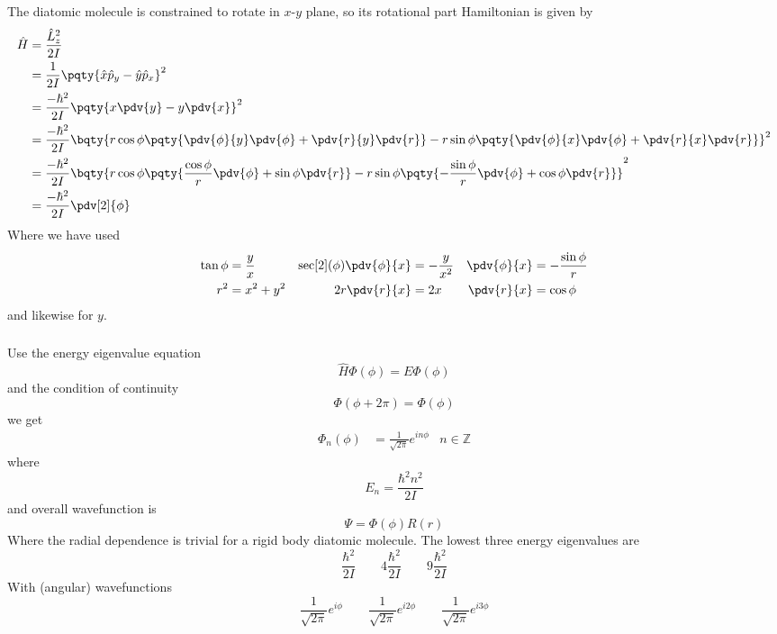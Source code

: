 \documentclass[12pt]{article}
\begin{document}
\section{}
\subsection{} 
        \subsubsection{} The diatomic molecule is constrained to rotate in \(x\)-\(y\) plane, so its rotational part Hamiltonian is given by \begin{align*}
            \hat{H} &= \frac{\hat{L}_z^2}{2I}\\
            &= \frac{1}{2I}\pqty{\hat{x} \hat{p}_y - \hat{y} \hat{p}_x}^2\\
            &= \frac{ - \hbar^2}{2I}\pqty{x\pdv{y} - y\pdv{x}}^2\\
            &= \frac{ - \hbar^2}{2I}\bqty{r\cos\phi\pqty{\pdv{\phi}{y}\pdv{\phi} + \pdv{r}{y}\pdv{r}} - r\sin\phi\pqty{\pdv{\phi}{x}\pdv{\phi} + \pdv{r}{x}\pdv{r}}}^2\\
            &= \frac{ - \hbar^2}{2I}\bqty{r\cos\phi\pqty{\frac{\cos\phi}{r} \pdv{\phi} + \sin\phi \pdv{r}} - r\sin\phi\pqty{ - \frac{\sin\phi}{r} \pdv{\phi} + \cos\phi \pdv{r}}}^2\\
            &= \frac{ - \hbar^2}{2I}\pdv[2]{\phi}
        \end{align*}
        Where we have used \begin{align*}
            \tan\phi &= \frac{y}{x}& \sec[2](\phi) \pdv{\phi}{x} &=  - \frac{y}{x^2}& \pdv{\phi}{x} &= - \frac{\sin\phi}{r}\\
            r^2 &= x^2 + y^2& 2r\pdv{r}{x} &= 2x& \pdv{r}{x} &= \cos\phi
        \end{align*}
        and likewise for \(y\).
        \subsubsection{} Use the energy eigenvalue equation \[
            \hat{H}\Phi(\phi) = E\Phi(\phi)
        \]
        and the condition of continuity \[
            \Phi(\phi + 2\pi) = \Phi(\phi)
        \]
        we get \begin{align*}
            \Phi_n(\phi) &= \frac{1}{\sqrt{2\pi}} e^{ i n\phi} &n\in \mathbb{Z}
        \end{align*}
        where \[E_n = \frac{\hbar^2n^2}{2I}\]
        and overall wavefunction is \[
            \Psi = \Phi (\phi)R(r)
        \]
        Where the radial dependence is trivial for a rigid body diatomic molecule. The lowest three energy eigenvalues are \[
            \frac{\hbar^2}{2I}\qquad 4\frac{\hbar^2}{2I} \qquad 9\frac{\hbar^2}{2I}
        \]
        With (angular) wavefunctions \[
            \frac{1}{\sqrt{2\pi}} e^{i \phi} \qquad\frac{1}{\sqrt{2\pi}} e^{i 2\phi}  \qquad\frac{1}{\sqrt{2\pi}} e^{i 3\phi} 
        \]
\end{document}
